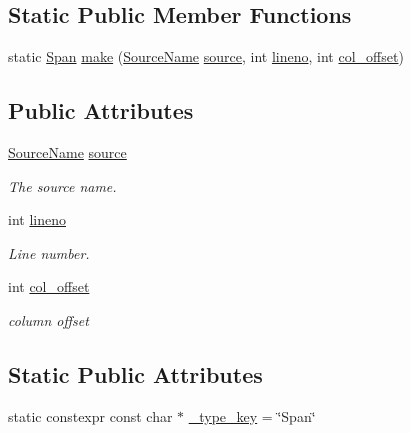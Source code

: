 \subsection*{Static Public Member Functions}
\begin{DoxyCompactItemize}
\item 
static \hyperlink{classtvm_1_1Span}{Span} \hyperlink{classtvm_1_1SpanNode_a8f29d1c9ad850eff8cf8a2664a0f5c1b}{make} (\hyperlink{classtvm_1_1SourceName}{Source\+Name} \hyperlink{classtvm_1_1SpanNode_afde422b06b0b110c002b543770360f84}{source}, int \hyperlink{classtvm_1_1SpanNode_ad605e038c640219d8372d83ae68f2173}{lineno}, int \hyperlink{classtvm_1_1SpanNode_a78d2dc28f35d2625b95697de63a16264}{col\+\_\+offset})
\end{DoxyCompactItemize}
\subsection*{Public Attributes}
\begin{DoxyCompactItemize}
\item 
\hyperlink{classtvm_1_1SourceName}{Source\+Name} \hyperlink{classtvm_1_1SpanNode_afde422b06b0b110c002b543770360f84}{source}
\begin{DoxyCompactList}\small\item\em The source name. \end{DoxyCompactList}\item 
int \hyperlink{classtvm_1_1SpanNode_ad605e038c640219d8372d83ae68f2173}{lineno}
\begin{DoxyCompactList}\small\item\em Line number. \end{DoxyCompactList}\item 
int \hyperlink{classtvm_1_1SpanNode_a78d2dc28f35d2625b95697de63a16264}{col\+\_\+offset}
\begin{DoxyCompactList}\small\item\em column offset \end{DoxyCompactList}\end{DoxyCompactItemize}
\subsection*{Static Public Attributes}
\begin{DoxyCompactItemize}
\item 
static constexpr const char $\ast$ \hyperlink{classtvm_1_1SpanNode_a3ce9fb38ce356931682dd0ff6e7e511f}{\+\_\+type\+\_\+key} = \char`\"{}Span\char`\"{}
\end{DoxyCompactItemize}


